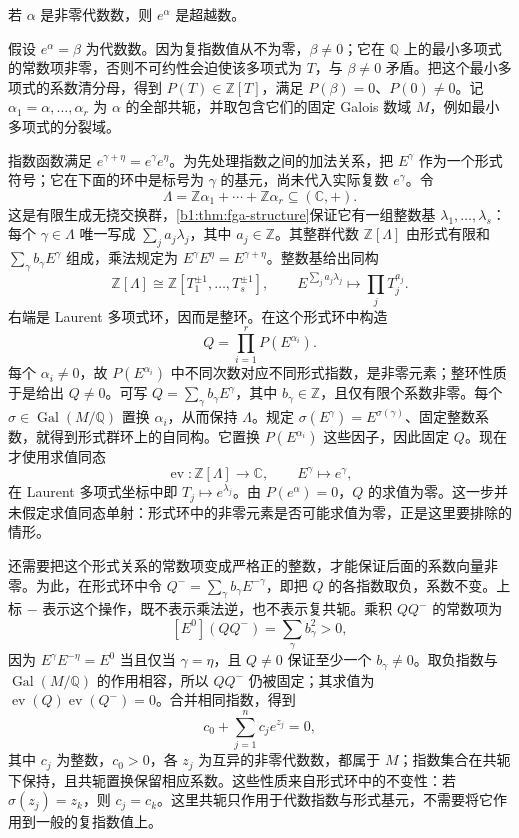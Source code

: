 \begin{theorem}\label{b1:thm:lindemann-weierstrass-special-case}
	若 \(\alpha\) 是非零代数数，则 \(e^\alpha\) 是超越数。
\end{theorem}
\begin{proofsketch}
	假设 \(e^\alpha=\beta\) 为代数数。因为复指数值从不为零，\(\beta\ne0\)；它在 \(\mathbb Q\) 上的最小多项式的常数项非零，否则不可约性会迫使该多项式为 \(T\)，与 \(\beta\ne0\) 矛盾。把这个最小多项式的系数清分母，得到 \(P(T)\in\mathbb Z[T]\)，满足 \(P(\beta)=0\)、\(P(0)\ne0\)。记 \(\alpha_1=\alpha,\ldots,\alpha_r\) 为 \(\alpha\) 的全部共轭，并取包含它们的固定 Galois 数域 \(M\)，例如最小多项式的分裂域。

	指数函数满足 \(e^{\gamma+\eta}=e^\gamma e^\eta\)。为先处理指数之间的加法关系，把 \(E^\gamma\) 作为一个形式符号；它在下面的环中是标号为 \(\gamma\) 的基元，尚未代入实际复数 \(e^\gamma\)。令
	\[
		\Lambda=\mathbb Z\alpha_1+\cdots+\mathbb Z\alpha_r\subseteq(\mathbb C,+).
	\]
	这是有限生成无挠交换群，\cref{b1:thm:fga-structure}保证它有一组整数基 \(\lambda_1,\ldots,\lambda_s\)：每个 \(\gamma\in\Lambda\) 唯一写成 \(\sum_j a_j\lambda_j\)，其中 \(a_j\in\mathbb Z\)。其整群代数 \(\mathbb Z[\Lambda]\) 由形式有限和 \(\sum_\gamma b_\gamma E^\gamma\) 组成，乘法规定为 \(E^\gamma E^\eta=E^{\gamma+\eta}\)。整数基给出同构
	\[
		\mathbb Z[\Lambda]\cong\mathbb Z[T_1^{\pm1},\ldots,T_s^{\pm1}], \qquad E^{\sum_j a_j\lambda_j}\longmapsto\prod_j T_j^{a_j}.
	\]
	右端是 Laurent 多项式环，因而是整环。在这个形式环中构造
	\[
		Q=\prod_{i=1}^r P(E^{\alpha_i}).
	\]
	每个 \(\alpha_i\ne0\)，故 \(P(E^{\alpha_i})\) 中不同次数对应不同形式指数，是非零元素；整环性质于是给出 \(Q\ne0\)。可写 \(Q=\sum_\gamma b_\gamma E^\gamma\)，其中 \(b_\gamma\in\mathbb Z\)，且仅有限个系数非零。每个 \(\sigma\in\operatorname{Gal}(M/\mathbb Q)\) 置换 \(\alpha_i\)，从而保持 \(\Lambda\)。规定 \(\sigma(E^\gamma)=E^{\sigma(\gamma)}\)、固定整数系数，就得到形式群环上的自同构。它置换 \(P(E^{\alpha_i})\) 这些因子，因此固定 \(Q\)。现在才使用求值同态
	\[
		\operatorname{ev}:\mathbb Z[\Lambda]\longrightarrow\mathbb C, \qquad E^\gamma\longmapsto e^\gamma,
	\]
	在 Laurent 多项式坐标中即 \(T_j\mapsto e^{\lambda_j}\)。由 \(P(e^\alpha)=0\)，\(Q\) 的求值为零。这一步并未假定求值同态单射：形式环中的非零元素是否可能求值为零，正是这里要排除的情形。

	还需要把这个形式关系的常数项变成严格正的整数，才能保证后面的系数向量非零。为此，在形式环中令 \(Q^-=\sum_\gamma b_\gamma E^{-\gamma}\)，即把 \(Q\) 的各指数取负，系数不变。上标 \(-\) 表示这个操作，既不表示乘法逆，也不表示复共轭。乘积 \(QQ^-\) 的常数项为
	\[
		[E^0](QQ^-)=\sum_\gamma b_\gamma^2>0,
	\]
	因为 \(E^\gamma E^{-\eta}=E^0\) 当且仅当 \(\gamma=\eta\)，且 \(Q\ne0\) 保证至少一个 \(b_\gamma\ne0\)。取负指数与 \(\operatorname{Gal}(M/\mathbb Q)\) 的作用相容，所以 \(QQ^-\) 仍被固定；其求值为 \(\operatorname{ev}(Q)\operatorname{ev}(Q^-)=0\)。合并相同指数，得到
	\[
		c_0+\sum_{j=1}^n c_j e^{z_j}=0,
	\]
	其中 \(c_j\) 为整数，\(c_0>0\)，各 \(z_j\) 为互异的非零代数数，都属于 \(M\)；指数集合在共轭下保持，且共轭置换保留相应系数。这些性质来自形式环中的不变性：若 \(\sigma(z_j)=z_k\)，则 \(c_j=c_k\)。这里共轭只作用于代数指数与形式基元，不需要将它作用到一般的复指数值上。


\end{proofsketch}
